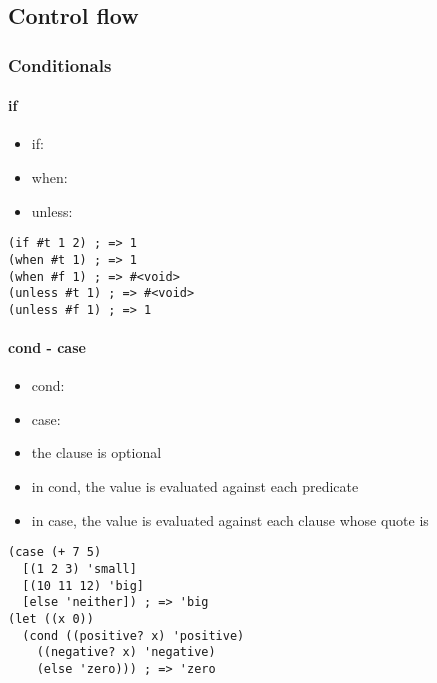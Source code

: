 \documentclass[a4paper,landscape,10pt]{article}
\begin{document}
\begin{multicols*}{2}
  \subsection{Control flow}

  \subsubsection{Conditionals}

  \paragraph{if}

  \begin{itemize}
    \item if: 
    \item when: 
    \item unless: 
  \end{itemize}

  \begin{lstlisting}[language=Racket]
(if #t 1 2) ; => 1
(when #t 1) ; => 1
(when #f 1) ; => #<void>
(unless #t 1) ; => #<void>
(unless #f 1) ; => 1
  \end{lstlisting}

  \paragraph{cond - case}

  \begin{itemize}
    \item cond: 
    \item case: 
    \item the  clause is optional
    \item in cond, the value is evaluated against each predicate
    \item in case, the value is evaluated against each clause whose quote is 
  \end{itemize}

  \begin{lstlisting}[language=Racket]
(case (+ 7 5)
  [(1 2 3) 'small]
  [(10 11 12) 'big]
  [else 'neither]) ; => 'big
(let ((x 0))
  (cond ((positive? x) 'positive)
    ((negative? x) 'negative)
    (else 'zero))) ; => 'zero
  \end{lstlisting}


\end{multicols*}
\end{document}
